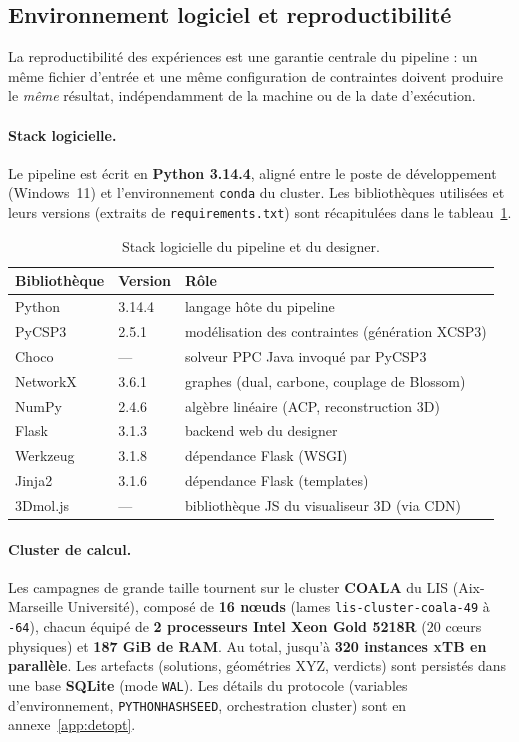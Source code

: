 \documentclass[11pt,a4paper]{article}
\newcommand{\xtb}{\textsc{xTB}}
\begin{document}
\subsection{Environnement logiciel et reproductibilité}
\label{sec:repro}

La reproductibilité des expériences est une garantie centrale du
pipeline : un même fichier d'entrée et une même configuration de
contraintes doivent produire le \emph{même} résultat, indépendamment de la machine ou de la date d'exécution.

\paragraph{Stack logicielle.}
Le pipeline est écrit en \textbf{Python 3.14.4}, aligné entre le poste
de développement (Windows~11) et l'environnement \texttt{conda} du
cluster. Les bibliothèques utilisées et leurs versions (extraits de
\texttt{requirements.txt}) sont récapitulées dans le
tableau~\ref{tab:stack}.

\begin{table}[!htbp]
\centering
\small
\begin{tabular}{lll}
\toprule
\textbf{Bibliothèque} & \textbf{Version} & \textbf{Rôle} \\
\midrule
Python      & 3.14.4 & langage hôte du pipeline \\
PyCSP3      & 2.5.1  & modélisation des contraintes (génération XCSP3) \\
Choco       & ---    & solveur PPC Java invoqué par PyCSP3 \\
NetworkX    & 3.6.1  & graphes (dual, carbone, couplage de Blossom) \\
NumPy       & 2.4.6  & algèbre linéaire (ACP, reconstruction 3D) \\
Flask       & 3.1.3  & backend web du designer \\
Werkzeug    & 3.1.8  & dépendance Flask (WSGI) \\
Jinja2      & 3.1.6  & dépendance Flask (templates) \\
3Dmol.js    & ---    & bibliothèque JS du visualiseur 3D (via CDN) \\
\bottomrule
\end{tabular}
\caption{Stack logicielle du pipeline et du designer.}
\label{tab:stack}
\end{table}

\paragraph{Cluster de calcul.}
Les campagnes de grande taille tournent sur le cluster \textbf{COALA}
du LIS (Aix-Marseille Université), composé de \textbf{16 nœuds}
(lames \texttt{lis-cluster-coala-49} à \texttt{-64}), chacun équipé
de \textbf{2 processeurs Intel Xeon Gold 5218R}
($20$ cœurs physiques) et \textbf{187 GiB de RAM}.
Au total, jusqu'à \textbf{320 instances \xtb{} en parallèle}. Les
artefacts (solutions, géométries XYZ, verdicts) sont persistés dans
une base \textbf{SQLite} (mode \texttt{WAL}). Les détails du protocole
(variables d'environnement, \texttt{PYTHONHASHSEED}, orchestration
cluster) sont en annexe~\ref{app:detopt}.
\end{document}

